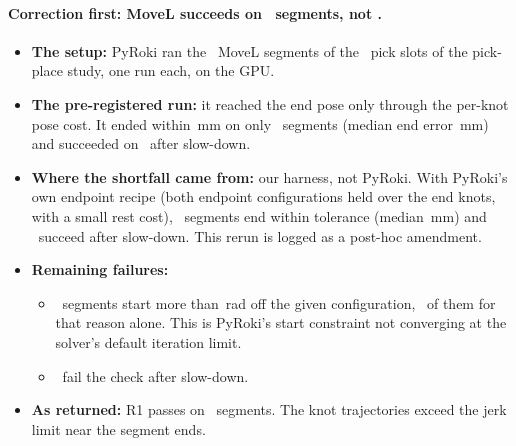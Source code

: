 \documentclass[11pt]{article}
\begin{document}
\paragraph{Correction first: MoveL succeeds on \moRecipe\ segments, not \moPre.}
\begin{itemize}
  \item \textbf{The setup:} PyRoki ran the \moSegs\ MoveL segments of the \moPicks\ pick slots of the pick-place study, one run each, on the GPU.
  \item \textbf{The pre-registered run:} it reached the end pose only through the per-knot pose cost. It ended within \ttEndMm\,mm on only \moEndPre\ segments (median end error \moEndMedPre\,mm) and succeeded on \moPre\ after slow-down.
  \item \textbf{Where the shortfall came from:} our harness, not PyRoki. With PyRoki's own endpoint recipe (both endpoint configurations held over the end knots, with a small rest cost), \moEndRecipe\ segments end within tolerance (median \moEndMedRecipe\,mm) and \moRecipe\ succeed after slow-down. This rerun is logged as a post-hoc amendment.
  \item \textbf{Remaining failures:}
  \begin{itemize}
    \item \moStartOff\ segments start more than \moStartTol\,rad off the given configuration, \moStartOnly\ of them for that reason alone. This is PyRoki's start constraint not converging at the solver's default iteration limit.
    \item \moGateFail\ fail the check after slow-down.
  \end{itemize}
  \item \textbf{As returned:} R1 passes on \moROne\ segments. The knot trajectories exceed the jerk limit near the segment ends.
\end{itemize}
\end{document}
